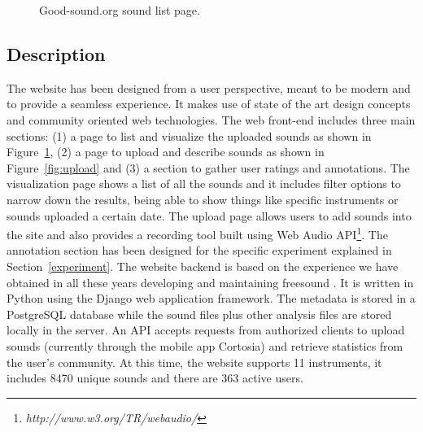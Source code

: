 \documentclass{article}
\begin{document}
\begin{figure}[ht]
 \centerline{}
 \caption{Good-sound.org sound list page.}
 \label{fig:sound_list}
\end{figure}

\subsection{Description} 
The website has been designed from a user perspective, meant to be modern and to provide a seamless experience. It makes use of state of the art design concepts and community oriented web technologies. The web front-end includes three main sections: (1) a page to list and visua\-lize the uploaded sounds as shown in Figure~\ref{fig:sound_list}, (2) a page to upload and describe sounds as shown in Figure~\ref{fig:upload} and (3) a section to gather user ratings and annotations. The visualization page shows a list of all the sounds and it includes filter options to narrow down the results, being able to show things like specific instruments or sounds uploaded a certain date. The upload page allows users to add sounds into the site and also provides a recording tool built using Web Audio API\footnote{\textit{http://www.w3.org/TR/webaudio/}}. The annotation section has been designed for the specific experiment explained in Section~\ref{experiment}. 
The website backend is based on the experience we have obtained in all these years developing and maintaining freesound\cite{2} . It is written in Python using the Django web application framework. The metadata is stored in a PostgreSQL database while the sound files plus other ana\-lysis files are stored locally in the server. An API accepts requests from authorized clients to upload sounds (currently through the mobile app Cortosia) and retrieve statistics from the user’s community. At this time, the website supports 11 instruments, it includes 8470 unique sounds and there are 363 active users. 
\end{document}
